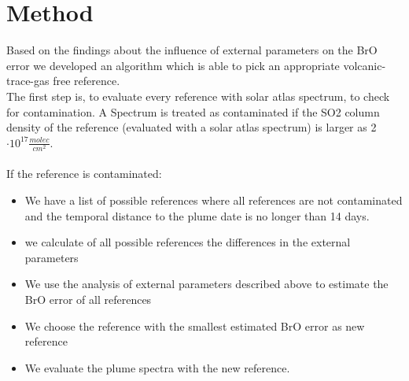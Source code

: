 \documentclass  [
  paper    = a4,
  BCOR     = 10mm,
  twoside,
  fontsize = 12pt,
  fleqn,
  toc      = bibnumbered,
  toc      = listofnumbered,
  numbers  = noendperiod,
  headings = normal,
  listof   = leveldown,
  version  = 3.03
]                                       {scrreprt}
\begin{document}
	\chapter{Method}
	Based on the findings about the influence of external parameters on the BrO error we developed an algorithm which is able to pick an appropriate volcanic-trace-gas free reference.\\ 
	The first step is, to evaluate every reference with solar atlas spectrum, to check for contamination.	A Spectrum is treated as contaminated if the SO2 column density of the reference (evaluated with a solar atlas spectrum) is larger as 2$\cdot 10^{17}\frac{molec}{cm^2}$.\\
	\\
	If the reference is contaminated:
	\begin{itemize}
		\item We have a list of possible references where all references are not contaminated and the temporal distance to the plume date is no longer than 14 days.
		\item we calculate of all possible references the differences in the external parameters
		\item We use the analysis of external parameters described above to estimate the BrO error of all references
		\item We choose the reference with the smallest estimated BrO error as new reference
		\item We evaluate the plume spectra with the new reference.
	\end{itemize}
\end{document}
